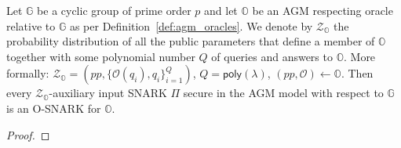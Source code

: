 \begin{theorem}
\label{the:when_osnarks} 
Let $\mathbb{G}$ be a cyclic group of prime order $p$ and let $\mathbb{O}$ be an AGM respecting oracle 
relative to $\mathbb{G}$ as per Definition~\ref{def:agm_oracles}. We denote by $\mathcal{Z}_{\mathbb{O}}$ the 
probability distribution of all the public parameters that define a member of $\mathbb{O}$ together with some 
polynomial number $Q$ of queries and answers to $\mathbb{O}$. More formally: 
$\mathcal{Z}_{\mathbb{O}} = (\mathit{pp}, \{\mathcal{O}(q_i), q_i\}_{i=1}^Q)$, $Q = \mathsf{poly}(\lambda)$, $(\mathit{pp}, \mathcal{O}) \leftarrow \mathbb{O}$. 
Then every $\mathcal{Z}_{\mathbb{O}}$-auxiliary input SNARK $\Pi$ secure in the AGM model with respect to $\mathbb{G}$ is an O-SNARK for $\mathbb{O}$.
\end{theorem}

\begin{proof}
\end{proof}


